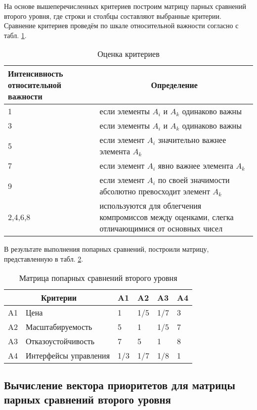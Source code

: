 На основе вышеперечисленных критериев построим матрицу парных сравнений второго уровня, где строки и столбцы составляют выбранные критерии.
Сравнение критериев проведём по шкале относительной важности согласно с табл. \ref{crit}.
\begin{table}[H]
  \caption{Оценка критериев}\label{crit}
  \begin{tabular}{|p{4cm}|p{12cm}|}
  \hline Интенсивность относительной важности & \multicolumn{1}{|c|}{Определение} \\
  \hline 1 & если элементы $A_i$ и $A_k$ одинаково важны \\
  \hline 3 & если элементы $A_i$ и $A_k$ одинаково важны \\
  \hline 5 & если элемент $A_i$ значительно важнее элемента $A_k$ \\
  \hline 7 & если элемент $A_i$ явно важнее элемента $A_k$ \\
  \hline 9 & если элемент $A_i$ по своей значимости абсолютно превосходит элемент $A_k$ \\
  \hline 2,4,6,8 & используются для облегчения компромиссов между оценками, слегка отличающимися от основных чисел \\
  \hline
  \end{tabular}
\end{table}

В результате выполнения попарных сравнений, построили матрицу, представленную в табл. \ref{matrix}.
\begin{table}[H]
  \caption{Матрица попарных сравнений второго уровня}\label{matrix}
  \begin{tabular}{|l|l|l|l|l|l|}
  \hline \multicolumn{2}{|c|}{Критерии} & A1 & A2 & A3 & A4 \\
  \hline A1 & Цена & 1 & 1/5 & 1/7 & 3 \\
  \hline A2 & Масштабируемость & 5 & 1 & 1/5 & 7 \\
  \hline A3 & Отказоустойчивость & 7 & 5 & 1 & 8 \\
  \hline A4 & Интерфейсы управления & 1/3 & 1/7 & 1/8 & 1 \\
  \hline
  \end{tabular}
\end{table}

\subsection{Вычисление вектора приоритетов для матрицы парных сравнений второго уровня}

